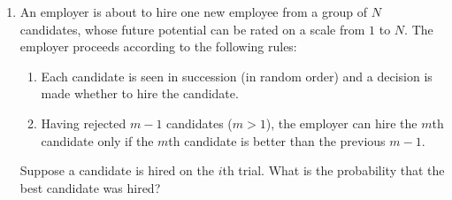 \documentclass[12pt]{article}
\theoremstyle{definition}
\theoremstyle{plain}
\newenvironment{solution}
  {\begin{proof}[Solution]}
  {\end{proof}}
\newcommand{\deriv}[1]{\frac{d}{d #1}}
\begin{document}
\begin{enumerate}
\begin{solution}
\begin{enumerate}
		Thus the probability of hitting region $ i $ is 
		\[ P(X = i) = \frac{ \frac{\pi r^2}{25} (11 - 2i) }{\pi r^2} = \frac{11 - 2i}{25}.\]
	
	\item It is easy to see that as $ i $ increases, $ P(X = i) $ decreases. Taking the derivative of the function,
		\begin{align*}
			\deriv{x} P(x) &= \frac{-2}{25} < 0.
		\end{align*}
		This holds for all $ x \in \mathbb{R} $, hence $ P(X) $ is a decreasing function.
		
	\item The function $ P(X) $ given above has domain $ S = \{ 1, 2, 3, 4, 5\} $, which is the sample space. To prove that $ P $ is indeed a probability function, we will show that it satisfies the conditions of Theorem $ 1.2.6 $, from which it follows that $ P $ is a probability function. Let $ p_i := P(X = i) $ which we will show all sum to $ 1 $. 
	\begin{align*}
		\sum_{i = 1}^5 p_i &= \sum_{i = 1}^5 \frac{11 - 2i}{25}\\
		&= \frac{\sum_{i=1}^5 11 - 2 \sum_{i=1}^5 i}{25}\\
		&= \frac{5 \cdot 11 - 2 \frac{5*6}{2} }{25}\\
		&= \frac{55 - 30}{25} \\
		&= \frac{25}{25} = 1.
	\end{align*}
	The probability function from the Theorem induced by the $ p_i $'s above coincides with $ P(X) $ since $ P( \{i\}) = \sum_{\{i \mid i \in \{i\} \} }p_i = p_i $, for all $ i \in S $.
	\end{enumerate} 
	\end{solution}
	

\setcounter{enumi}{31}
\item An employer is about to hire one new employee from a group of $ N $ candidates, whose future potential can be rated on a scale from $ 1 $ to $ N $. The employer proceeds 
according to the following rules:
	\begin{enumerate}
	\item Each candidate is seen in succession (in random order) and a decision is made whether to hire the candidate.
	\item Having rejected $ m - 1 $ candidates ($ m > 1 $), the employer can hire the $ m $th candidate only if the $ m $th candidate is better than the previous $ m - 1 $.
	\end{enumerate}
Suppose a candidate is hired on the $ i $th trial. What is the probability that the best candidate was hired?


\end{enumerate}
\end{document}

